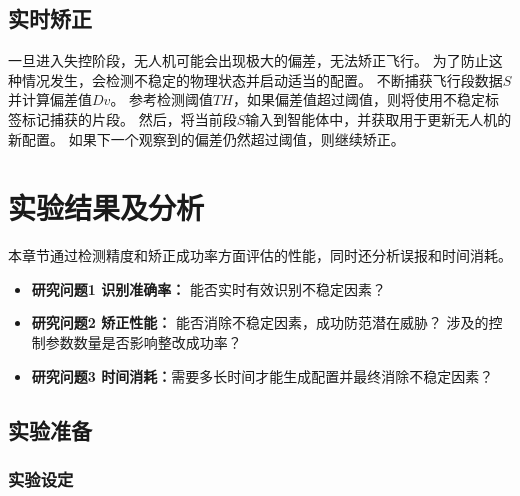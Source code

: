 \subsection{实时矫正}
一旦进入失控阶段，无人机可能会出现极大的偏差，无法矫正飞行。
为了防止这种情况发生，\nyctea 会检测不稳定的物理状态并启动适当的配置。
\nyctea 不断捕获飞行段数据$S$并计算偏差值$Dv$。
参考检测阈值$TH$，如果偏差值超过阈值，则\nyctea 将使用不稳定标签标记捕获的片段。
然后，\nyctea 将当前段$S$输入到智能体中，并获取用于更新无人机的新配置。
如果下一个观察到的偏差仍然超过阈值，则继续矫正。

\section{实验结果及分析}

本章节通过检测精度和矫正成功率方面评估\nyctea 的性能，同时还分析误报和时间消耗。
\begin{itemize}
 
\item \textbf{研究问题1 识别准确率：} \nyctea 能否实时有效识别不稳定因素？

\item \textbf{研究问题2 矫正性能：} \nyctea 能否消除不稳定因素，成功防范潜在威胁？ 涉及的控制参数数量是否影响整改成功率？

\item \textbf{研究问题3 时间消耗：}\nyctea 需要多长时间才能生成配置并最终消除不稳定因素？

\end{itemize}
\subsection{实验准备}

\subsubsection{实验设定}

